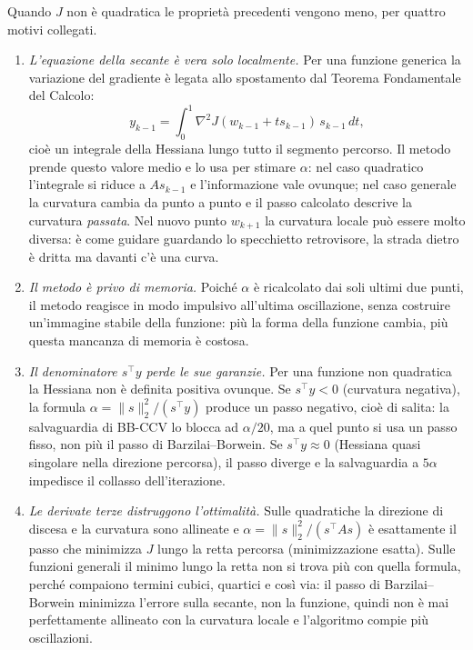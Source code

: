 \documentclass[italian, a4paper, twoside, binding=6mm]{sapthesis}
\begin{document}
Quando $J$ non è quadratica
le proprietà precedenti vengono meno, per quattro motivi collegati.
\begin{enumerate}
  \item \emph{L'equazione della secante è vera solo localmente.} Per una
  funzione generica la variazione del gradiente è legata allo spostamento dal
  Teorema Fondamentale del Calcolo:
  \[
  y_{k-1} = \int_0^1 \nabla^2 J(w_{k-1} + t s_{k-1})\, s_{k-1}\, dt,
  \]
  cioè un integrale della Hessiana lungo tutto il segmento percorso. Il metodo
  prende questo valore medio e lo usa per stimare $\alpha$: nel caso
  quadratico l'integrale si riduce a $A s_{k-1}$ e l'informazione vale
  ovunque; nel caso generale la curvatura cambia da punto a punto e il passo
  calcolato descrive la curvatura \emph{passata}. Nel nuovo punto $w_{k+1}$ la
  curvatura locale può essere molto diversa: è come guidare guardando lo
  specchietto retrovisore, la strada dietro è dritta ma davanti c'è una curva.
  \item \emph{Il metodo è privo di memoria.} Poiché $\alpha$ è ricalcolato dai
  soli ultimi due punti, il metodo reagisce in modo impulsivo all'ultima
  oscillazione, senza costruire un'immagine stabile della funzione: più la
  forma della funzione cambia, più questa mancanza di memoria è costosa.
  \item \emph{Il denominatore $s^\top y$ perde le sue garanzie.} Per una
  funzione non quadratica la Hessiana non è definita positiva ovunque. Se
  $s^\top y < 0$ (curvatura negativa), la formula $\alpha = \|s\|_2^2 /
  (s^\top y)$ produce un passo negativo, cioè di salita: la salvaguardia di
  BB-CCV lo blocca ad $\alpha/20$, ma a quel punto si usa un passo fisso, non
  più il passo di Barzilai--Borwein. Se $s^\top y \approx 0$ (Hessiana quasi
  singolare nella direzione percorsa), il passo diverge e la salvaguardia a
  $5\alpha$ impedisce il collasso dell'iterazione.
  \item \emph{Le derivate terze distruggono l'ottimalità.} Sulle quadratiche
  la direzione di discesa e la curvatura sono allineate e
  $\alpha = \|s\|_2^2/(s^\top A s)$ è esattamente il passo che minimizza $J$
  lungo la retta percorsa (minimizzazione esatta). Sulle funzioni generali il
  minimo lungo la retta non si trova più con quella formula, perché compaiono
  termini cubici, quartici e così via: il passo di Barzilai--Borwein
  minimizza l'errore sulla secante, non la funzione, quindi non è mai
  perfettamente allineato con la curvatura locale e l'algoritmo compie più
  oscillazioni.
\end{enumerate}
\end{document}

